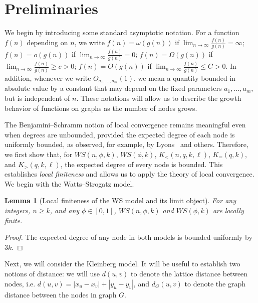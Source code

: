 \documentclass[10pt]{amsart}
\newtheorem{lemma}[theorem]{Lemma}
\begin{document}
\section{Preliminaries} \label{prelims}

We begin by introducing some standard asymptotic notation. For a function \(f(n)\) depending on \(n\), we write \(f(n) = \omega(g(n))\) if \(\lim_{n \to \infty} \frac{f(n)}{g(n)} = \infty\);  \(f(n) = o(g(n))\) if \(\lim_{n \to \infty} \frac{f(n)}{g(n)} = 0\); \(f(n) = \Omega(g(n))\) if \(\lim_{n \to \infty} \frac{f(n)}{g(n)} \geq c > 0\); \(f(n) = O(g(n))\) if \(\lim_{n \to \infty} \frac{f(n)}{g(n)} \leq C > 0\). 
In addition, whenever we write \(O_{a_1,\dots,a_m}(1)\), we mean a quantity bounded in absolute value by a constant that may depend on the fixed parameters \(a_1,\dots,a_m\), but is independent of \(n\). These notations will allow us to describe the growth behavior of functions on graphs as the number of nodes grows.

The Benjamini--Schramm notion of local convergence remains meaningful even when degrees are unbounded, provided the expected degree of each node is uniformly bounded, as observed, for example, by Lyons~\cite{Lyons2005} and others.
Therefore, we first show that, for $WS(n,\phi,k)$, $WS(\phi,k)$, $K_<(n,q,k,\ell)$, $K_{=}(q,k)$, and $K_{>}(q,k,\ell)$, the expected degree of every node is bounded. This establishes \textit{local finiteness} and allows us to apply the theory of local convergence. We begin with the Watts--Strogatz model.

\begin{lemma}[Local finiteness of the WS model and its limit object] \label{prelim-1}
   For any integers, $n\geq k$, and any $\phi\in[0,1]$,  $WS(n, \phi, k)$ and $WS(\phi, k)$ are  locally finite.
\end{lemma}

\begin{proof}
The expected degree of any node in both models is bounded uniformly by $3k$. 
\end{proof}

Next, we will consider the Kleinberg model. It will be useful to establish two notions of distance: we will use $d(u, v)$ to denote the lattice distance between nodes, i.e. $d(u, v) = |x_u - x_v| + |y_u - y_v|$, and $d_G(u, v)$ to denote the graph distance between the nodes in graph $G$.
\end{document}
